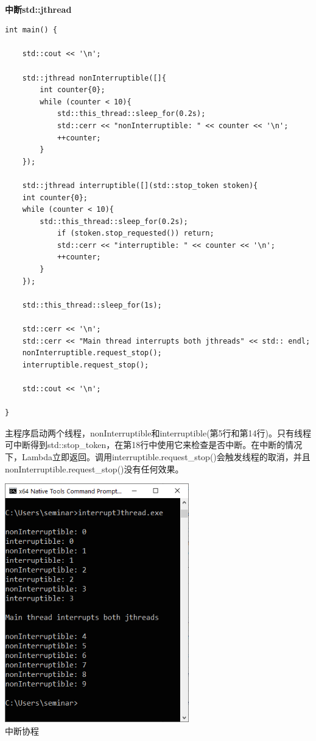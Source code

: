 \hspace*{\fill} \\ %
\noindent
\textbf{中断std::jthread}
\begin{lstlisting}[style=styleCXX]
int main() {
	
	std::cout << '\n';
	
	std::jthread nonInterruptible([]{
		int counter{0};
		while (counter < 10){
			std::this_thread::sleep_for(0.2s);
			std::cerr << "nonInterruptible: " << counter << '\n';
			++counter;
		}
	});
	
	std::jthread interruptible([](std::stop_token stoken){
	int counter{0};
	while (counter < 10){
		std::this_thread::sleep_for(0.2s);
			if (stoken.stop_requested()) return;
			std::cerr << "interruptible: " << counter << '\n';
			++counter;
		}
	});
	
	std::this_thread::sleep_for(1s);
	
	std::cerr << '\n';
	std::cerr << "Main thread interrupts both jthreads" << std:: endl;
	nonInterruptible.request_stop();
	interruptible.request_stop();
	
	std::cout << '\n';
	
}
\end{lstlisting}

主程序启动两个线程，nonInterruptible和interruptible(第5行和第14行)。只有线程可中断得到std::stop\_token，在第18行中使用它来检查是否中断。在中断的情况下，Lambda立即返回。调用interruptible.request\_stop()会触发线程的取消，并且nonInterruptible.request\_stop()没有任何效果。

\begin{center}
\includegraphics[width=0.6\textwidth]{content/2/chapter3/images/8.png}\\
中断协程
\end{center}

